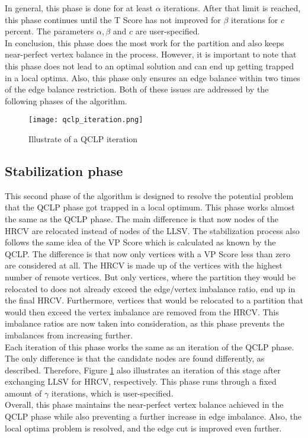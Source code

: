 \documentclass[acmsmall,nonacm,screen,review]{acmart}
\begin{document}
In general, this phase is done for at least $\alpha$ iterations. After that limit is reached, this phase continues until the T Score has not improved for $\beta$ iterations for $c$ percent. The parameters $\alpha,\beta$ and $c$ are user-specified. \\
In conclusion, this phase does the most work for the partition and also keeps near-perfect vertex balance in the process. However, it is important to note that this phase does not lead to an optimal solution and can end up getting trapped in a local optima. Also, this phase only ensures an edge balance within two times of the edge balance restriction. Both of these issues are addressed by the following phases of the algorithm.
\begin{figure}[t]
\centering
\caption{Illustrate of a QCLP iteration}
\label{iteration}
\texttt{[image: qclp\_iteration.png]}
\end{figure}
\subsection{Stabilization phase}
This second phase of the algorithm is designed to resolve the potential problem that the QCLP phase got trapped in a local optimum. This phase works almost the same as the QCLP phase. The main difference is that now nodes of the HRCV are relocated instead of nodes of the LLSV. The stabilization process also follows the same idea of the VP Score which is calculated as known by the QCLP. The difference is that now only vertices with a VP Score less than zero are considered at all. The HRCV is made up of the vertices with the highest number of remote vertices. But only vertices, where the partition they would be relocated to does not already exceed the edge/vertex imbalance ratio, end up in the final HRCV. Furthermore, vertices that would be relocated to a partition that would then exceed the vertex imbalance are removed from the HRCV. This imbalance ratios are now taken into consideration, as this phase prevents the imbalances from increasing further. \\
Each iteration of this phase works the same as an iteration of the QCLP phase. The only difference is that the candidate nodes are found differently, as described. Therefore, Figure \ref{iteration} also illustrates an iteration of this stage after exchanging LLSV for HRCV, respectively. This phase runs through a fixed amount of $\gamma$ iterations, which is user-specified. \\
Overall, this phase maintains the near-perfect vertex balance achieved in the QCLP phase while also preventing a further increase in edge imbalance. Also, the local optima problem is resolved, and the edge cut is improved even further.
\end{document}

